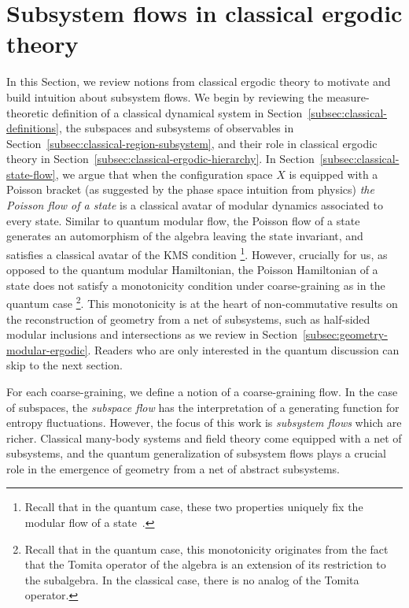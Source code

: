 \documentclass[a4paper,11pt]{article}
\theoremstyle{definition}
\begin{document}
\section{Subsystem flows in classical ergodic theory}\label{sec:classical}

In this Section, we review notions from classical ergodic theory to motivate and build intuition about subsystem flows. 
We begin by reviewing the measure-theoretic definition of a classical dynamical system in Section~\ref{subsec:classical-definitions}, the subspaces and subsystems of observables in Section~\ref{subsec:classical-region-subsystem}, and their role in classical ergodic theory in Section~\ref{subsec:classical-ergodic-hierarchy}. In Section~\ref{subsec:classical-state-flow}, we argue that when the configuration space $X$ is equipped with a Poisson bracket (as suggested by the phase space intuition from physics) {\it the Poisson flow of a state} is a classical avatar of modular dynamics associated to every state. Similar to quantum modular flow, the Poisson flow of a state generates an automorphism of the algebra leaving the state invariant, and satisfies a classical avatar of the KMS condition \footnote{Recall that in the quantum case, these two properties uniquely fix the modular flow of a state~\cite{Takesaki1970}.}. However, crucially for us, as opposed to the quantum modular Hamiltonian, the Poisson Hamiltonian of a state does not satisfy a monotonicity condition under coarse-graining as in the quantum case \footnote{Recall that in the quantum case, this monotonicity originates from the fact that the Tomita operator of the algebra is an extension of its restriction to the subalgebra. In the classical case, there is no analog of the Tomita operator.}. This monotonicity is at the heart of non-commutative results on the reconstruction of geometry from a net of subsystems, such as half-sided modular inclusions and intersections as we review in Section~\ref{subsec:geometry-modular-ergodic}. Readers who are only interested in the quantum discussion can skip to the next section.

For each coarse-graining, we define a notion of a coarse-graining flow. In the case of subspaces, the {\it subspace flow} has the interpretation of a generating function for entropy fluctuations. However, the focus of this work is {\it subsystem flows} which are richer.
Classical many-body systems and field theory come equipped with a net of subsystems, and the quantum generalization of subsystem flows plays a crucial role in the emergence of geometry from a net of abstract subsystems. 
\end{document}
